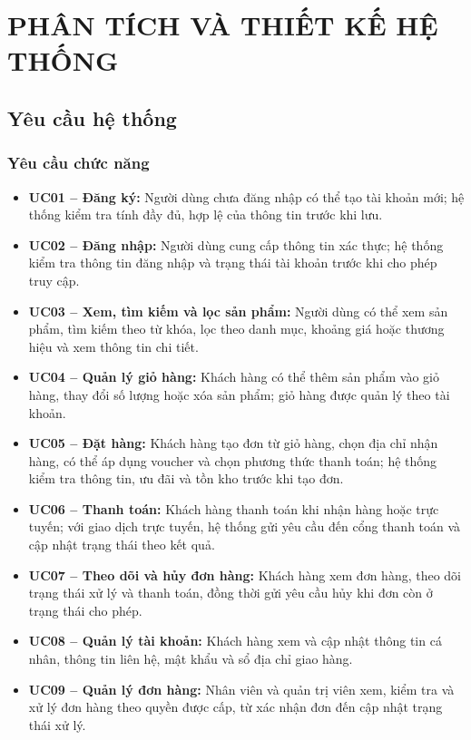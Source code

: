 \chapter{PHÂN TÍCH VÀ THIẾT KẾ HỆ THỐNG}\label{chap2_intro}
\vspace{-40pt}

\section{Yêu cầu hệ thống}
\subsection{Yêu cầu chức năng}
\begin{itemize}
    \item \textbf{UC01 -- Đăng ký:} Người dùng chưa đăng nhập có thể tạo tài khoản mới; hệ thống kiểm tra tính đầy đủ, hợp lệ của thông tin trước khi lưu.
    \item \textbf{UC02 -- Đăng nhập:} Người dùng cung cấp thông tin xác thực; hệ thống kiểm tra thông tin đăng nhập và trạng thái tài khoản trước khi cho phép truy cập.
    \item \textbf{UC03 -- Xem, tìm kiếm và lọc sản phẩm:} Người dùng có thể xem sản phẩm, tìm kiếm theo từ khóa, lọc theo danh mục, khoảng giá hoặc thương hiệu và xem thông tin chi tiết.
    \item \textbf{UC04 -- Quản lý giỏ hàng:} Khách hàng có thể thêm sản phẩm vào giỏ hàng, thay đổi số lượng hoặc xóa sản phẩm; giỏ hàng được quản lý theo tài khoản.
    \item \textbf{UC05 -- Đặt hàng:} Khách hàng tạo đơn từ giỏ hàng, chọn địa chỉ nhận hàng, có thể áp dụng voucher và chọn phương thức thanh toán; hệ thống kiểm tra thông tin, ưu đãi và tồn kho trước khi tạo đơn.
    \item \textbf{UC06 -- Thanh toán:} Khách hàng thanh toán khi nhận hàng hoặc trực tuyến; với giao dịch trực tuyến, hệ thống gửi yêu cầu đến cổng thanh toán và cập nhật trạng thái theo kết quả.
    \item \textbf{UC07 -- Theo dõi và hủy đơn hàng:} Khách hàng xem đơn hàng, theo dõi trạng thái xử lý và thanh toán, đồng thời gửi yêu cầu hủy khi đơn còn ở trạng thái cho phép.
    \item \textbf{UC08 -- Quản lý tài khoản:} Khách hàng xem và cập nhật thông tin cá nhân, thông tin liên hệ, mật khẩu và sổ địa chỉ giao hàng.
    \item \textbf{UC09 -- Quản lý đơn hàng:} Nhân viên và quản trị viên xem, kiểm tra và xử lý đơn hàng theo quyền được cấp, từ xác nhận đơn đến cập nhật trạng thái xử lý.

\end{itemize}
